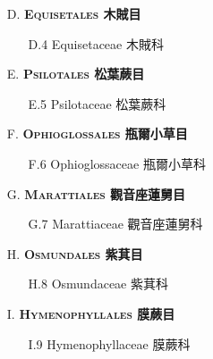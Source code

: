 \begin{enumerate}
  \item[D. ] \textbf{\textsc{Equisetales} 木賊目}   
    \begin{enumerate}
      \item[D.4] Equisetaceae 木賊科      
        
    \end{enumerate}
  \item[E. ] \textbf{\textsc{Psilotales} 松葉蕨目}   
    \begin{enumerate}
      \item[E.5] Psilotaceae 松葉蕨科      
        
    \end{enumerate}
  \item[F. ] \textbf{\textsc{Ophioglossales} 瓶爾小草目}   
    \begin{enumerate}
      \item[F.6] Ophioglossaceae 瓶爾小草科      
        
    \end{enumerate}
  \item[G. ] \textbf{\textsc{Marattiales} 觀音座蓮舅目}   
    \begin{enumerate}
      \item[G.7] Marattiaceae 觀音座蓮舅科      
        
    \end{enumerate}
  \item[H. ] \textbf{\textsc{Osmundales} 紫萁目}   
    \begin{enumerate}
      \item[H.8] Osmundaceae 紫萁科      
        
    \end{enumerate}
  \item[I. ] \textbf{\textsc{Hymenophyllales} 膜蕨目}   
    \begin{enumerate}
      \item[I.9] Hymenophyllaceae 膜蕨科      
        

\end{enumerate}
\end{enumerate}
